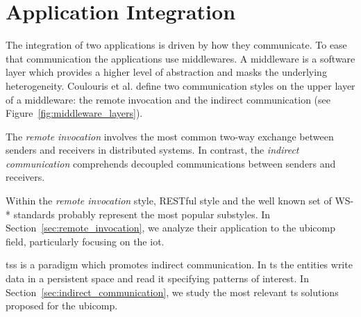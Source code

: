 \section{Application Integration}
\label{sec:integration}

%
%


The integration of two applications is driven by how they communicate.
To ease that communication the applications use middlewares.
A middleware is a software layer which provides a higher level of abstraction and masks the underlying heterogeneity.
Coulouris et al. \cite{coulouris_distributed_2012} define two communication styles on the upper layer of a middleware: %
the remote invocation and the indirect communication (see Figure~\ref{fig:middleware_layers}).



The \emph{remote invocation} involves the most common two-way exchange between senders and receivers in distributed systems.
In contrast, the \emph{indirect communication} comprehends decoupled communications between senders and receivers.


Within the \emph{remote invocation} style, RESTful style \cite{fielding_architectural_2000} and the well known set of WS-* \cite{alonso_web_2010} standards probably represent the most popular substyles.
In Section~\ref{sec:remote_invocation}, we analyze their application to the \ac{ubicomp} field, particularly focusing on the \ac{iot}.


\aclp{ts} is a paradigm which promotes indirect communication.
In \ac{ts} the entities write data in a persistent space and read it specifying patterns of interest.
In Section~\ref{sec:indirect_communication}, we study the most relevant \acl{ts} solutions proposed for the \acl{ubicomp}.



